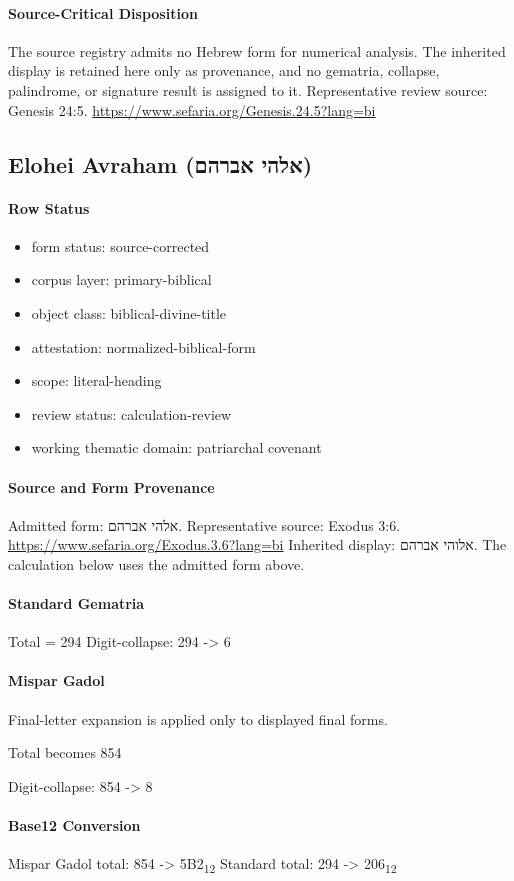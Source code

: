 \paragraph{Source-Critical Disposition}
The source registry admits no Hebrew form for numerical analysis. The inherited display is retained here only as provenance, and no gematria, collapse, palindrome, or signature result is assigned to it.
Representative review source: Genesis 24:5.
\url{https://www.sefaria.org/Genesis.24.5?lang=bi}

\subsection{Elohei Avraham (אלהי אברהם)}
\paragraph{Row Status}
\begin{itemize}
\item form status: source-corrected
\item corpus layer: primary-biblical
\item object class: biblical-divine-title
\item attestation: normalized-biblical-form
\item scope: literal-heading
\item review status: calculation-review
\item working thematic domain: patriarchal covenant
\end{itemize}
\paragraph{Source and Form Provenance}
Admitted form: אלהי אברהם.
Representative source: Exodus 3:6.
\url{https://www.sefaria.org/Exodus.3.6?lang=bi}
Inherited display: אלוהי אברהם. The calculation below uses the admitted form above.
\paragraph{Standard Gematria}
Total = 294
Digit-collapse: 294 -> 6
\paragraph{Mispar Gadol}
Final-letter expansion is applied only to displayed final forms.

Total becomes 854

Digit-collapse: 854 -> 8
\paragraph{Base12 Conversion}
Mispar Gadol total: 854 -> 5B2\textsubscript{12}
Standard total: 294 -> 206\textsubscript{12}
